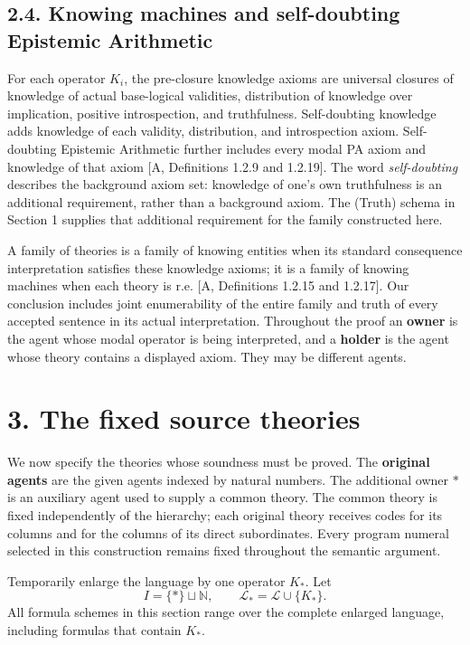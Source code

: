 \documentclass[
  11pt,
  letterpaper,
]{article}
\begin{document}
\subsection{2.4. Knowing machines and self-doubting Epistemic
Arithmetic}\label{knowing-machines-and-self-doubting-epistemic-arithmetic}

For each operator \(K_i\), the pre-closure knowledge axioms are
universal closures of knowledge of actual base-logical validities,
distribution of knowledge over implication, positive introspection, and
truthfulness. Self-doubting knowledge adds knowledge of each validity,
distribution, and introspection axiom. Self-doubting Epistemic
Arithmetic further includes every modal PA axiom and knowledge of that
axiom {[}A, Definitions 1.2.9 and 1.2.19{]}. The word
\emph{self-doubting} describes the background axiom set: knowledge of
one's own truthfulness is an additional requirement, rather than a
background axiom. The (Truth) schema in Section 1 supplies that
additional requirement for the family constructed here.

A family of theories is a family of knowing entities when its standard
consequence interpretation satisfies these knowledge axioms; it is a
family of knowing machines when each theory is r.e. {[}A, Definitions
1.2.15 and 1.2.17{]}. Our conclusion includes joint enumerability of the
entire family and truth of every accepted sentence in its actual
interpretation. Throughout the proof an \textbf{owner} is the agent
whose modal operator is being interpreted, and a \textbf{holder} is the
agent whose theory contains a displayed axiom. They may be different
agents.

\section{3. The fixed source theories}\label{the-fixed-source-theories}

We now specify the theories whose soundness must be proved. The
\textbf{original agents} are the given agents indexed by natural
numbers. The additional owner \(*\) is an auxiliary agent used to supply
a common theory. The common theory is fixed independently of the
hierarchy; each original theory receives codes for its columns and for
the columns of its direct subordinates. Every program numeral selected
in this construction remains fixed throughout the semantic argument.

Temporarily enlarge the language by one operator \(K_*\). Let \[
I=\{*\}\sqcup\mathbb N,\qquad \mathcal L_*=\mathcal L\cup\{K_*\}.
\] All formula schemes in this section range over the complete enlarged
language, including formulas that contain \(K_*\).
\end{document}
